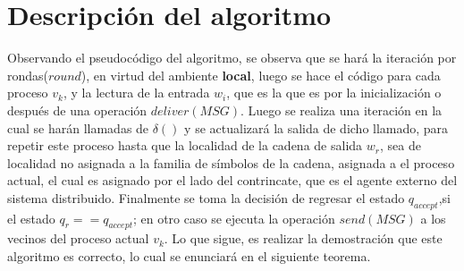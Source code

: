 \documentclass[10pt]{report}
\begin{document}
    \section{Descripción del algoritmo}\label{sec:descripción-del-algoritmo}
    Observando el pseudocódigo del algoritmo, se observa que se hará la iteración por rondas($round$), en
    virtud del ambiente \textbf{local}, luego se hace el código para cada proceso $v_{k}$, y la lectura de
    la entrada $w_{i}$, que es la que es por la inicialización o después de una operación $deliver(MSG)$.
    \hfill
    Luego se realiza una iteración en la cual se harán llamadas de $\delta()$ y se actualizará la salida de dicho llamado, para repetir este
    proceso hasta que la localidad de la cadena de salida $w_{r}$, sea de localidad no asignada a la familia de símbolos
    de la cadena, asignada a el proceso actual, el cual es asignado por el lado del contrincate, que es el agente externo del sistema distribuido.
    \hfill
    Finalmente se toma la decisión de regresar el estado $q_{accept}$,si el estado $q_{r}==q_{accept}$;
    en otro caso se ejecuta la operación $send(MSG)$ a los vecinos del proceso actual $v_{k}$.
    \hfill
    Lo que sigue, es realizar la demostración que este algoritmo es correcto, lo cual se enunciará en el siguiente teorema.
\end{document}
